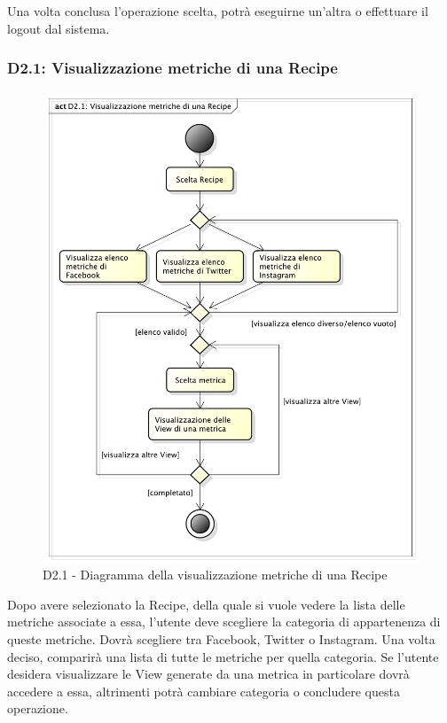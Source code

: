 			\noindent
		Una volta conclusa l'operazione scelta, potrà eseguirne un'altra o effettuare il logout dal sistema.


		\subsubsection{D2.1: Visualizzazione metriche di una Recipe} %
		\label{ssub:visualizzazione_metriche_di_una_recipe}
		\label{ssub:registrazione_al_sistema}
		\begin{figure}[!htbp]
			\centering
			\centerline{\includegraphics[scale=0.45]{./images/D2_1.pdf}}
			\caption{D2.1 - Diagramma della visualizzazione metriche di una Recipe}
		\end{figure}
		\noindent
		Dopo avere selezionato la Recipe, della quale si vuole vedere la lista delle metriche associate a essa, l'utente deve scegliere la categoria di appartenenza di queste metriche. Dovrà scegliere tra Facebook, Twitter o Instagram. Una volta deciso, comparirà una lista di tutte le metriche per quella categoria. Se l'utente desidera visualizzare le View generate da una metrica in particolare dovrà accedere a essa, altrimenti potrà cambiare categoria o concludere questa operazione.


